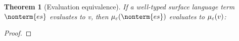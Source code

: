 \documentclass[a4paper]{article}
\newtheorem{theorem}{Theorem}
\begin{document}
\begin{theorem}[Evaluation equivalence]
  If a well-typed surface language term $\nonterm{es}$ evaluates to v, then $\tranterm(\nonterm{es})$ evaluates to $\mu_\varepsilon(v)$:
\end{theorem}
\begin{proof}
\end{proof}



\end{document}
